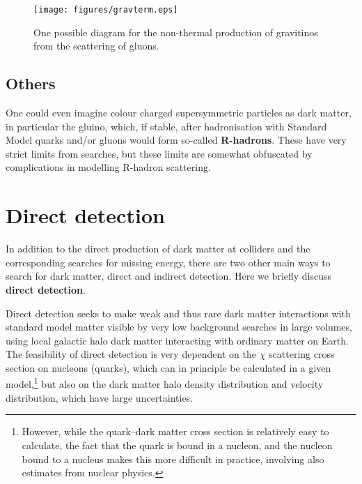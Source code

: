 \documentclass[notes.tex]{subfiles}
\begin{document}
\begin{figure}[h!]
\begin{center}
\texttt{[image: figures/gravterm.eps]} 
\caption{One possible diagram for the non-thermal production of gravitinos from the scattering of gluons.\label{gravterm}}
\end{center}
\end{figure}


\subsection{Others}
One could even imagine colour charged supersymmetric particles as dark matter, in particular the gluino, which, if stable, after hadronisation with Standard Model quarks and/or gluons would form so-called {\bf R-hadrons}. These have very strict limits from searches, but these limits are somewhat obfuscated by complications in modelling R-hadron scattering.



\section{Direct detection}
\label{sec:DD}
In addition to the direct production of dark matter at colliders and the corresponding searches for missing energy, there are two other main ways to search for dark matter, direct and indirect detection. Here we briefly discuss {\bf direct detection}.

Direct detection seeks to make weak and thus rare dark matter interactions with standard model matter visible by very low background searches in large volumes, using local galactic halo dark matter interacting with ordinary matter on Earth. The feasibility of direct detection  is very dependent on the $\chi$ scattering cross section on nucleons (quarks), which can in principle be calculated in a given model,\footnote{However, while the quark--dark matter cross section is relatively easy to calculate, the fact that the quark is bound in a nucleon, and the nucleon bound to a nucleus makes this more difficult in practice, involving also estimates from nuclear physics.} but also on the dark matter halo density distribution and velocity distribution, which have large uncertainties. 
\end{document}
